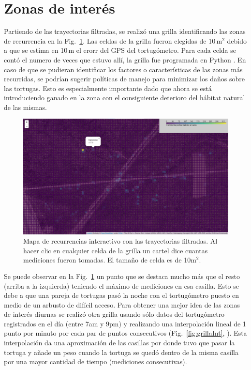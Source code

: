 \section{Zonas de interés}
Partiendo de las trayectorias filtradas, se realizó  una grilla identificando las zonas de recurrencia en la Fig.~\ref{fig:grilla1}. Las celdas de la grilla fueron elegidas de 10\,m$^2$ debido a que se estima en 10\,m el erorr del GPS del tortugómetro. Para cada celda se contó el numero de veces que estuvo allí, la grilla fue programada en Python \cite{github}. En caso de que se pudieran identificar los factores o características de las zonas más recurridas, se podrían sugerir políticas de manejo para minimizar los daños sobre las tortugas. Esto es especialmente importante dado que ahora se está introduciendo ganado en la zona con el consiguiente deterioro del hábitat natural de las mismas.
 
 
\begin{figure}[ht]
    \begin{center}
    \includegraphics[width=\imsize]{Chap2/GrillaSintCNoche.png}
    \end{center}
    \caption[Mapa de zonas de recurrencia.]{Mapa de recurrencias  interactivo con las trayectorias filtradas. Al hacer clic en cualquier celda de la grilla un cartel dice cuantas mediciones fueron tomadas. El tamaño de celda es de 10m$^2$.}
    \label{fig:grilla1}
\end{figure}
 
Se puede observar en la Fig.~\ref{fig:grilla1} un punto que se destaca mucho más que el resto (arriba a la izquierda) teniendo el máximo de mediciones en esa casilla. Esto se debe a que una pareja de tortugas pasó la noche con el tortugómetro puesto en medio de un arbusto de difícil acceso. Para obtener una mejor idea de las zonas de interés diurnas se realizó otra grilla usando sólo datos del tortugómetro registrados en el día (entre 7am y 9pm) y  realizando una interpolación lineal de 1 punto por minuto por cada par de puntos consecutivos (Fig.~\ref{fig:grillaInt}, \cite{github}). Esta interpolación da una aproximación de las casillas por donde tuvo que pasar la tortuga y añade un peso cuando la tortuga se quedó dentro de la misma casilla por una mayor cantidad de tiempo (mediciones consecutivas).
 
